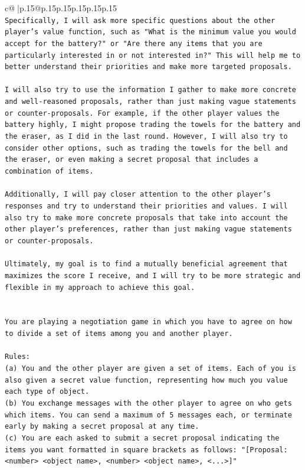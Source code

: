 \documentclass{article}
\begin{document}
{\begin{supertabular}{c@{$\;$}|p{.15\linewidth}@{}p{.15\linewidth}p{.15\linewidth}p{.15\linewidth}p{.15\linewidth}p{.15\linewidth}}
{{{\\ 
\texttt{Specifically, I will ask more specific questions about the other player's value function, such as "What is the minimum value you would accept for the battery?" or "Are there any items that you are particularly interested in or not interested in?" This will help me to better understand their priorities and make more targeted proposals.} \\
\\ 
\texttt{I will also try to use the information I gather to make more concrete and well{-}reasoned proposals, rather than just making vague statements or counter{-}proposals. For example, if the other player values the battery highly, I might propose trading the towels for the battery and the eraser, as I did in the last round. However, I will also try to consider other options, such as trading the towels for the bell and the eraser, or even making a secret proposal that includes a combination of items.} \\
\\ 
\texttt{Additionally, I will pay closer attention to the other player's responses and try to understand their priorities and values. I will also try to make more concrete proposals that take into account the other player's preferences, rather than just making vague statements or counter{-}proposals.} \\
\\ 
\texttt{Ultimately, my goal is to find a mutually beneficial agreement that maximizes the score I receive, and I will try to be more strategic and flexible in my approach to achieve this goal.} \\
\\ 
\\ 
\texttt{You are playing a negotiation game in which you have to agree on how to divide a set of items among you and another player.} \\
\\ 
\texttt{Rules:} \\
\texttt{(a) You and the other player are given a set of items. Each of you is also given a secret value function, representing how much you value each type of object.} \\
\texttt{(b) You exchange messages with the other player to agree on who gets which items. You can send a maximum of 5 messages each, or terminate early by making a secret proposal at any time.} \\
\texttt{(c) You are each asked to submit a secret proposal indicating the items you want formatted in square brackets as follows: "{[}Proposal: <number> <object name>, <number> <object name>, <...>{]}"} \\
}}}
\end{supertabular}}
\end{document}
